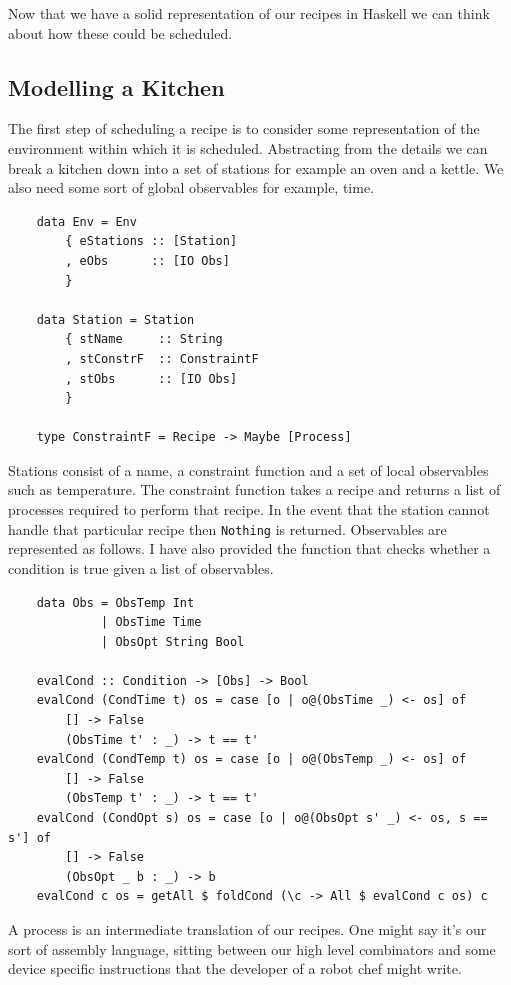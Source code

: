 \documentclass[11pt]{article}
\begin{document}
Now that we have a solid representation of our recipes in Haskell we can think about how
these could be scheduled.

\subsection{Modelling a Kitchen}

The first step of scheduling a recipe is to consider some representation of the
environment within which it is scheduled. Abstracting from the details we can
break a kitchen down into a set of stations for example an oven and a kettle.
We also need some sort of global observables for example, time.

\begin{lstlisting}
    data Env = Env
        { eStations :: [Station]
        , eObs      :: [IO Obs]
        }

    data Station = Station
        { stName     :: String
        , stConstrF  :: ConstraintF
        , stObs      :: [IO Obs]
        }

    type ConstraintF = Recipe -> Maybe [Process]
\end{lstlisting}

Stations consist of a name, a constraint function and a set of local observables such as temperature.
The constraint function takes a recipe and returns a list of processes required to perform that recipe.
In the event that the station cannot handle that particular recipe then \texttt{Nothing} is returned.
Observables are represented as follows. I have also provided the function that checks whether a
condition is true given a list of observables.

\begin{lstlisting}
    data Obs = ObsTemp Int
             | ObsTime Time
             | ObsOpt String Bool

    evalCond :: Condition -> [Obs] -> Bool
    evalCond (CondTime t) os = case [o | o@(ObsTime _) <- os] of
        [] -> False
        (ObsTime t' : _) -> t == t'
    evalCond (CondTemp t) os = case [o | o@(ObsTemp _) <- os] of
        [] -> False
        (ObsTemp t' : _) -> t == t'
    evalCond (CondOpt s) os = case [o | o@(ObsOpt s' _) <- os, s == s'] of
        [] -> False
        (ObsOpt _ b : _) -> b
    evalCond c os = getAll $ foldCond (\c -> All $ evalCond c os) c
\end{lstlisting}

A process is an intermediate translation of our recipes. One might say it's our sort of assembly
language, sitting between our high level combinators and some device specific instructions that the
developer of a robot chef might write.
\end{document}
